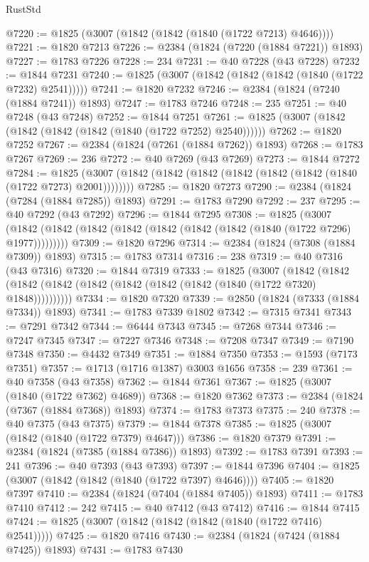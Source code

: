 \begin{lexlean}{RustStd}
\begin{coremodule}
{\begin{coremodule}
{{{{{{{{{{{{{{{{{{{{{{{{{{{{{{{{{{{{{{{{{{{{{{{@7220 := @1825 (@3007 (@1842 (@1842 (@1840 (@1722 @7213) @4646))))
@7221 := @1820 @7213
@7226 := @2384 (@1824 (@7220 (@1884 @7221)) @1893)
@7227 := @1783 @7226
@7228 := 234
@7231 := @40 @7228 (@43 @7228)
@7232 := @1844 @7231
@7240 := @1825 (@3007 (@1842 (@1842 (@1842 (@1840 (@1722 @7232) @2541)))))
@7241 := @1820 @7232
@7246 := @2384 (@1824 (@7240 (@1884 @7241)) @1893)
@7247 := @1783 @7246
@7248 := 235
@7251 := @40 @7248 (@43 @7248)
@7252 := @1844 @7251
@7261 := @1825 (@3007 (@1842 (@1842 (@1842 (@1842 (@1840 (@1722 @7252) @2540))))))
@7262 := @1820 @7252
@7267 := @2384 (@1824 (@7261 (@1884 @7262)) @1893)
@7268 := @1783 @7267
@7269 := 236
@7272 := @40 @7269 (@43 @7269)
@7273 := @1844 @7272
@7284 := @1825 (@3007 (@1842 (@1842 (@1842 (@1842 (@1842 (@1842 (@1840 (@1722 @7273) @2001))))))))
@7285 := @1820 @7273
@7290 := @2384 (@1824 (@7284 (@1884 @7285)) @1893)
@7291 := @1783 @7290
@7292 := 237
@7295 := @40 @7292 (@43 @7292)
@7296 := @1844 @7295
@7308 := @1825
    (@3007 (@1842 (@1842 (@1842 (@1842 (@1842 (@1842 (@1842 (@1840 (@1722 @7296) @1977)))))))))
@7309 := @1820 @7296
@7314 := @2384 (@1824 (@7308 (@1884 @7309)) @1893)
@7315 := @1783 @7314
@7316 := 238
@7319 := @40 @7316 (@43 @7316)
@7320 := @1844 @7319
@7333 := @1825
    (@3007
      (@1842 (@1842 (@1842 (@1842 (@1842 (@1842 (@1842 (@1842 (@1840 (@1722 @7320) @1848))))))))))
@7334 := @1820 @7320
@7339 := @2850 (@1824 (@7333 (@1884 @7334)) @1893)
@7341 := @1783 @7339 @1802
@7342 := @7315 @7341
@7343 := @7291 @7342
@7344 := @6444 @7343
@7345 := @7268 @7344
@7346 := @7247 @7345
@7347 := @7227 @7346
@7348 := @7208 @7347
@7349 := @7190 @7348
@7350 := @4432 @7349
@7351 := @1884 @7350
@7353 := @1593 (@7173 @7351)
@7357 := @1713 (@1716 @1387) @3003 @1656
@7358 := 239
@7361 := @40 @7358 (@43 @7358)
@7362 := @1844 @7361
@7367 := @1825 (@3007 (@1840 (@1722 @7362) @4689))
@7368 := @1820 @7362
@7373 := @2384 (@1824 (@7367 (@1884 @7368)) @1893)
@7374 := @1783 @7373
@7375 := 240
@7378 := @40 @7375 (@43 @7375)
@7379 := @1844 @7378
@7385 := @1825 (@3007 (@1842 (@1840 (@1722 @7379) @4647)))
@7386 := @1820 @7379
@7391 := @2384 (@1824 (@7385 (@1884 @7386)) @1893)
@7392 := @1783 @7391
@7393 := 241
@7396 := @40 @7393 (@43 @7393)
@7397 := @1844 @7396
@7404 := @1825 (@3007 (@1842 (@1842 (@1840 (@1722 @7397) @4646))))
@7405 := @1820 @7397
@7410 := @2384 (@1824 (@7404 (@1884 @7405)) @1893)
@7411 := @1783 @7410
@7412 := 242
@7415 := @40 @7412 (@43 @7412)
@7416 := @1844 @7415
@7424 := @1825 (@3007 (@1842 (@1842 (@1842 (@1840 (@1722 @7416) @2541)))))
@7425 := @1820 @7416
@7430 := @2384 (@1824 (@7424 (@1884 @7425)) @1893)
@7431 := @1783 @7430
}}}}}}}}}}}}}}}}}}}}}}}}}}}}}}}}}}}}}}}}}}}}}}}
\end{coremodule}}
\end{coremodule}
\end{lexlean}
